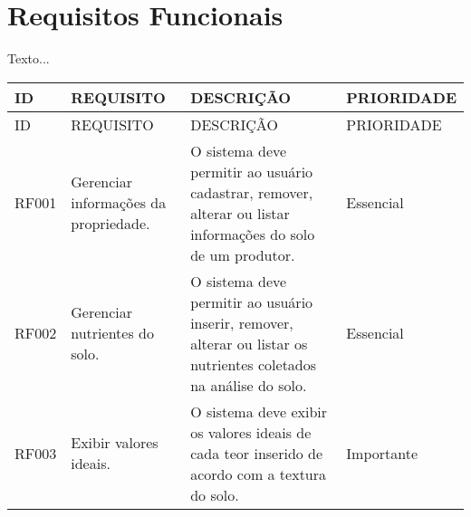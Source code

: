 \section{Requisitos Funcionais}
\label{sec:titSecReqFunc}

Texto...

\begin{longtable}{|p{1.5cm}|p{3cm}|p{7cm}|p{2.5cm}|}
    \hline
    ID    & REQUISITO                                                                        & DESCRIÇÃO                                                                                                                                                                                                                                                                                               & PRIORIDADE \\\hline
    \endfirsthead
    \hline
    ID    & REQUISITO                                                                        & DESCRIÇÃO                                                                                                                                                                                                                                                                                               & PRIORIDADE \\\hline
    \endhead
    RF001 & Gerenciar informações da propriedade.                                            & O sistema deve permitir ao usuário cadastrar, remover, alterar ou listar informações do solo de um produtor.                                                                                                                                                                                            & Essencial  \\\hline
    RF002 & Gerenciar nutrientes do solo.                                                    & O sistema deve permitir ao usuário inserir, remover, alterar ou listar os nutrientes coletados na análise do solo.                                                                                                                                                                                      & Essencial  \\\hline
    RF003 & Exibir valores ideais.                                                           & O sistema deve exibir os valores ideais de cada teor inserido de acordo com a textura do solo.                                                                                                                                                                                                          & Importante \\\hline

\end{longtable}
